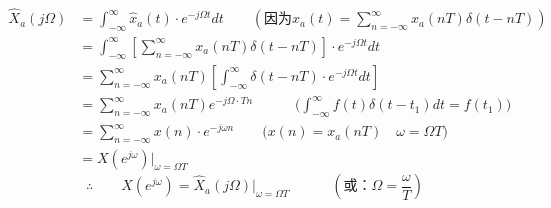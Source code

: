 \documentclass[notheorems,compress,mathserif,table]{beamer}
\begin{document}
\begin{frame}[shrink]\frametitle{}%
        \begin{equation*}
        \begin{split}
         \hat{X}_a(j\Omega)
             &= \int_{-\infty}^{\infty}\hat{x}_a(t)\cdot e^{-j\Omega t}dt    \qquad\left(\mbox{因为}\hat{x}_a(t)=\sum_{n=-\infty}^{\infty}x_a(nT)\delta(t-nT)\right)    \\
             &= \int_{-\infty}^{\infty}\left[\sum_{n=-\infty}^{\infty}x_a(nT)\delta(t-nT)\right]\cdot e^{-j\Omega t}dt \\
             &= \sum_{n=-\infty}^{\infty}x_a(nT)\left[\int_{-\infty}^{\infty}\delta(t-nT)\cdot e^{-j\Omega t}dt\right] \\
             &= \sum_{n=-\infty}^{\infty}x_a(nT) e^{-j\Omega\cdot T n} \quad\quad\quad\Big(\int_{-\infty}^{\infty}f(t)\delta(t-t_1)dt = f(t_1)\Big)\\
             &= \sum_{n=-\infty}^{\infty}x(n)\cdot e^{-j\omega n} \quad\quad \Big(x(n) =x_a(nT)\quad \omega =\Omega T \Big)\\
             &= X(e^{j\omega})\big|_{\omega = \Omega T}
        \end{split}
        \end{equation*}
        $$\therefore \quad\quad X(e^{j\omega})  = \hat{X}_a(j\Omega)\big|_{\omega = \Omega T}
                 \quad\quad\quad(\mbox{或：}\Omega=\frac{\omega}{T})$$
\end{frame}
\end{document}
